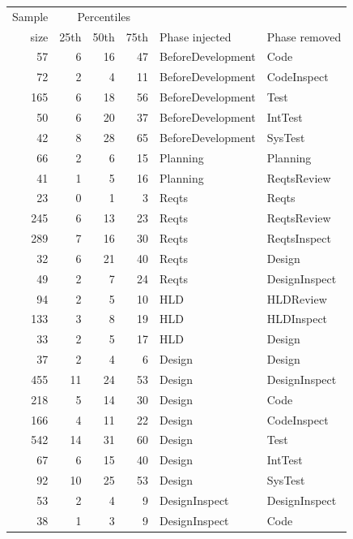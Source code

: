 \documentclass{sig-alternate}
\def\baselinestretch{1}
\begin{document}
\begin{figure}[!t]

\scriptsize
\begin{center}
\begin{tabular}{r|rrr|ll}
  Sample&\multicolumn{3}{c|}{Percentiles}\\ 
size & 25th & 50th & 75th & Phase injected & Phase removed\\\hline
57& 6& 16& 47&  BeforeDevelopment&Code\\
72& 2& 4& 11&  BeforeDevelopment&CodeInspect\\
165& 6& 18& 56&  BeforeDevelopment&Test\\
50& 6& 20& 37&  BeforeDevelopment&IntTest\\
42& 8& 28& 65&  BeforeDevelopment&SysTest\\\hline

66& 2& 6& 15&  Planning&Planning\\
41& 1& 5& 16&  Planning&ReqtsReview\\\hline

23& 0& 1& 3&  Reqts&Reqts\\
245& 6& 13& 23&  Reqts&ReqtsReview\\
289& 7& 16& 30&  Reqts&ReqtsInspect\\
32& 6& 21& 40&  Reqts&Design\\
49& 2& 7& 24&  Reqts&DesignInspect\\\hline
 

94& 2& 5& 10&  HLD&HLDReview\\
133& 3& 8& 19&  HLD&HLDInspect\\
33& 2& 5& 17&  HLD&Design\\\hline



37& 2& 4& 6&  Design&Design\\
455& 11& 24& 53&  Design&DesignInspect\\
218& 5& 14& 30&  Design&Code\\
166& 4& 11& 22&  Design&CodeInspect\\
542& 14& 31& 60&  Design&Test\\
67& 6& 15& 40&  Design&IntTest\\
92& 10& 25& 53&  Design&SysTest\\\hline

53& 2& 4& 9&  DesignInspect&DesignInspect\\
38& 1& 3& 9&  DesignInspect&Code\\\hline


\end{tabular}
\end{center}
\end{figure}
\end{document}
